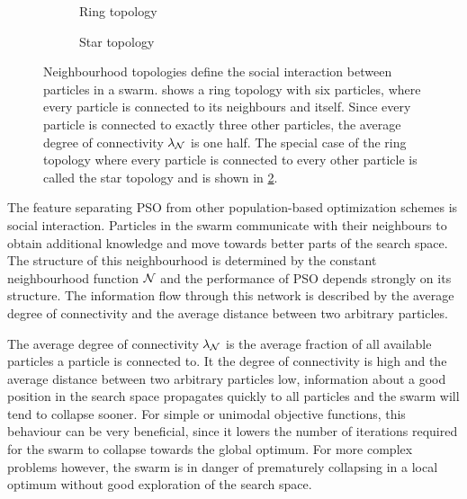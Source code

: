 \begin{figure}[t]
    \centering
    \begin{subfigure}{\subfigurewidth}
        \centering
        
        \caption{Ring topology}
        \label{fig:pso_topology:ring}
    \end{subfigure}
    \begin{subfigure}{\subfigurewidth}
        \centering
        
        \caption{Star topology}
        \label{fig:pso_topology:star}
    \end{subfigure}
    \caption[PSO neighbourhood topologies]{
        Neighbourhood topologies define the social interaction between particles in a swarm.
         shows a ring topology with six particles, where every particle is connected to its neighbours and itself.
        Since every particle is connected to exactly three other particles, the average degree of connectivity $\lambda_{\operatorname{\mathcal{N}}}$ is one half.
        The special case of the ring topology where every particle is connected to every other particle is called the star topology and is shown in \cref{fig:pso_topology:star}.
    }
    \label{fig:pso_topology}
\end{figure}
The feature separating PSO from other population-based optimization schemes is social interaction.
Particles in the swarm communicate with their neighbours to obtain additional knowledge and move towards better parts of the search space.
The structure of this neighbourhood is determined by the constant neighbourhood function $\operatorname{\mathcal{N}}$ and the performance of PSO depends strongly on its structure.
The information flow through this network is described by the average degree of connectivity and the average distance between two arbitrary particles.

The average degree of connectivity $\lambda_{\operatorname{\mathcal{N}}}$ is the average fraction of all available particles a particle is connected to.
It the degree of connectivity is high and the average distance between two arbitrary particles low, information about a good position in the search space propagates quickly to all particles and the swarm will tend to collapse sooner.
For simple or unimodal objective functions, this behaviour can be very beneficial, since it lowers the number of iterations required for the swarm to collapse towards the global optimum.
For more complex problems however, the swarm is in danger of prematurely collapsing in a local optimum without good exploration of the search space.

